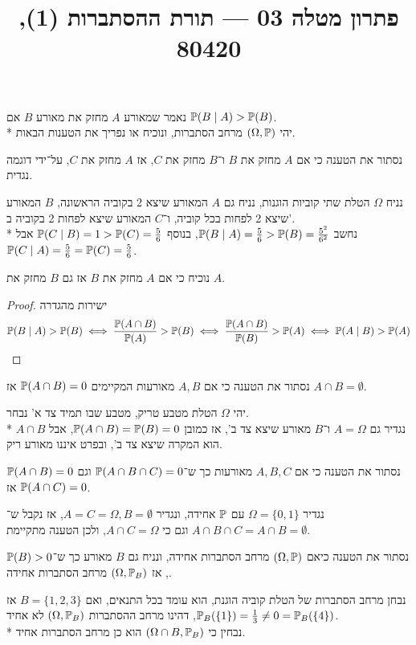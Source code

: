 
\title{פתרון מטלה 03 --- תורת ההסתברות (1), 80420}


\maketitle
\maketitleprint{}

\Question{}
נאמר שמאורע $A$ מחזק את מאורע $B$ אם $\mathbb{P}(B \mid A) > \mathbb{P}(B)$. \\*
יהי $(\Omega, \mathbb{P})$ מרחב הסתברות, ונוכיח או נפריך את הטענות הבאות.

\Subquestion{}
נסתור את הטענה כי אם $A$ מחזק את $B$ ו־$B$ מחזק את $C$, אז $A$ מחזק את $C$, על־ידי דוגמה נגדית.
\begin{solution}
	נניח $\Omega$ הטלת שתי קוביות הוגנות, נניח גם $A$ המאורע שיצא 2 בקוביה הראשונה, $B$ המאורע שיצא 2 לפחות בכל קוביה, ו־$C$ המאורע שיצא לפחות 2 בקוביה ב'. \\*
	נחשב $\mathbb{P}(B \mid A) = \frac{5}{6} > \mathbb{P}(B) = \frac{5^2}{6^2}$, בנוסף $\mathbb{P}(C \mid B) = 1 > \mathbb{P}(C) = \frac{5}{6}$ אבל $\mathbb{P}(C \mid A) = \frac{5}{6} = \mathbb{P}(C) = \frac{5}{6}$.
\end{solution}

\Subquestion{}
נוכיח כי אם $A$ מחזק את $B$ אז גם $B$ מחזק את $A$.
\begin{proof}
	ישירות מהגדרה
	\[
		\mathbb{P}(B \mid A) > \mathbb{P}(B)
		\iff \frac{\mathbb{P}(A \cap B)}{\mathbb{P}(A)} > \mathbb{P}(B)
		\iff \frac{\mathbb{P}(A \cap B)}{\mathbb{P}(B)} > \mathbb{P}(A)
		\iff \mathbb{P}(A \mid B) > \mathbb{P}(A)
	\]
\end{proof}

\Subquestion{}
נסתור את הטענה כי אם $A, B$ מאורעות המקיימים $\mathbb{P}(A \cap B) = 0$ אז $A \cap B = \emptyset$.
\begin{solution}
	יהי $\Omega$ הטלת מטבע טריק, מטבע שבו תמיד צד א' נבחר. \\*
	נגדיר גם $A = \Omega$ ו־$B$ מאורע שיצא צד ב', אז כמובן $\mathbb{P}(A \cap B) = \mathbb{P}(B) = 0$, אבל $A \cap B$ הוא המקרה שיצא צד ב', ובפרט איננו מאורע ריק.
\end{solution}

\Subquestion{}
נסתור את הטענה כי אם $A, B, C$ מאורעות כך ש־$\mathbb{P}(A \cap B \cap C) = 0$ וגם $\mathbb{P}(A \cap B) = 0$ אז $\mathbb{P}(A \cap C) = 0$.
\begin{solution}
	נגדיר $\Omega = \{0, 1\}$ עם $\mathbb{P}$ אחידה, ונגדיר $A = C = \Omega, B = \emptyset$, אז נקבל ש־$A \cap B \cap C = A \cap B = \emptyset$ וגם כי $A \cap C = \Omega$, ולכן הטענה מתקיימת.
\end{solution}

\Subquestion{}
נסתור את הטענה כיאם $(\Omega, \mathbb{P})$ מרחב הסתברות אחידה, ונניח גם $B$ מאורע כך ש־$\mathbb{P}(B) > 0$, אז $(\Omega, \mathbb{P}_B)$ מרחב הסתברות אחידה.
\begin{solution}
	נבחן מרחב הסתברות של הטלת קוביה הוגנת, הוא עומד בכל התנאים, ואם $B = \{ 1, 2, 3 \}$ אז $\mathbb{P}_B(\{1\}) = \frac{1}{3} \ne 0 = \mathbb{P}_B(\{4\})$, דהינו מרחב ההסתברות $(\Omega, \mathbb{P}_B)$ לא אחיד. \\*
	נבחין כי $(\Omega \cap B, \mathbb{P}_B)$ הוא כן מרחב הסתברות אחיד.
\end{solution}


